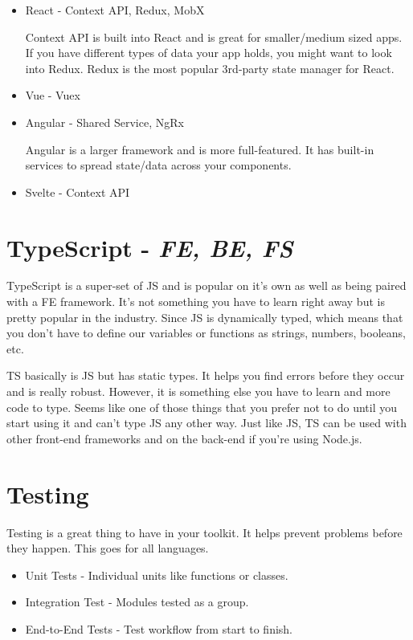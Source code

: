\begin{itemize}
    \item React - Context API, Redux, MobX
        
        Context API is built into React and is great for smaller/medium sized apps. If you have different types of data your app holds, you might want to look into Redux. Redux is the most popular 3rd-party state manager for React.
    \item Vue - Vuex
    \item Angular - Shared Service, NgRx
    
        Angular is a larger framework and is more full-featured. It has built-in services to spread state/data across your components. 
    \item Svelte - Context API
\end{itemize}

\section{TypeScript - \emph{FE, BE, FS}}

TypeScript is a super-set of JS and is popular on it's own as well as being paired with a FE framework. It's not something you have to learn right away but is pretty popular in the industry. Since JS is dynamically typed, which means that you don't have to define our variables or functions as strings, numbers, booleans, etc. 

TS basically is JS but has static types. It helps you find errors before they occur and is really robust. However, it is something else you have to learn and more code to type. Seems like one of those things that you prefer not to do until you start using it and can't type JS any other way. Just like JS, TS can be used with other front-end frameworks and on the back-end if you're using Node.js.

\section{Testing}
Testing is a great thing to have in your toolkit. It helps prevent problems before they happen. This goes for all languages. 

\begin{itemize}
    \item Unit Tests - Individual units like functions or classes.
    \item Integration Test - Modules tested as a group.
    \item End-to-End Tests - Test workflow from start to finish. 
\end{itemize}


